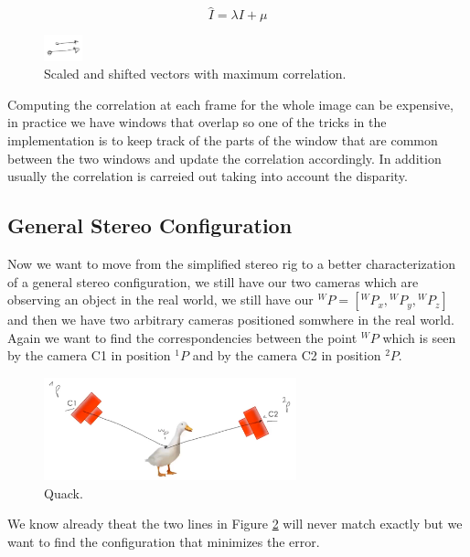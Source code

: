 \begin{multicols}{2}
\[
\hat{I} = \lambda I + \mu
\]
\begin{figure}[H]
    \centering
    \includegraphics[width=0.1\textwidth]{Figures/vectors.png}
    \caption{Scaled and shifted vectors with maximum correlation.}
    \label{fig:vectors}
\end{figure}
\end{multicols}

Computing the correlation at each frame for the whole image
can be expensive, in practice we have windows that overlap so one of the tricks in the implementation is to keep track of the parts of the window that are common between the two windows and update the correlation accordingly. In addition usually the correlation is carreied out taking into account the disparity.

\subsection{General Stereo Configuration}

Now we want to move from the simplified stereo rig to a better characterization of a general stereo configuration, we still have our two cameras which are observing an object in the real world, we still have our \({}^WP=[{}^WP_x, {}^WP_y,{}^WP_z]\) and then we have two arbitrary cameras positioned somwhere in the real world. Again we want to find the correspondencies between the point \({}^WP\) which is seen by the camera C1 in position \({}^1P\) and by the camera C2 in position \({}^2P\).

\begin{figure}[H]
    \centering
    \includegraphics[width=0.65\textwidth]{Figures/duck.png}
    \caption{Quack.}
    \label{fig:duck}
\end{figure}

We know already theat the two lines in Figure \ref{fig:duck} will never match exactly but we want to find the configuration that minimizes the error.
